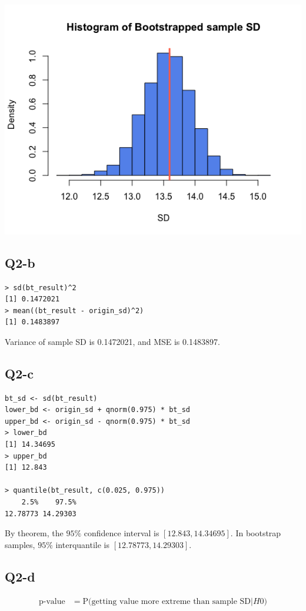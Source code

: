 \documentclass[12pt,letterpaper]{article}
\begin{document}
\includegraphics[width=150mm]{hist_bt_sd.png}

\subsection*{Q2-b}
\begin{verbatim}
> sd(bt_result)^2
[1] 0.1472021
> mean((bt_result - origin_sd)^2)
[1] 0.1483897
\end{verbatim}

\noindent Variance of sample SD is 0.1472021, and MSE is 0.1483897.

\subsection*{Q2-c}
\begin{verbatim}
bt_sd <- sd(bt_result)
lower_bd <- origin_sd + qnorm(0.975) * bt_sd
upper_bd <- origin_sd - qnorm(0.975) * bt_sd
> lower_bd
[1] 14.34695
> upper_bd
[1] 12.843

> quantile(bt_result, c(0.025, 0.975))
    2.5%    97.5% 
12.78773 14.29303 
\end{verbatim}

\noindent By theorem, the $95\%$ confidence interval is $[12.843, 14.34695]$. In bootstrap samples, $95\%$ interquantile is $[12.78773, 14.29303]$.

\subsection*{Q2-d}

\begin{align*}
\text{p-value} &= \text{P(getting value more extreme than sample SD} | H0)
\end{align*}
\end{document}
